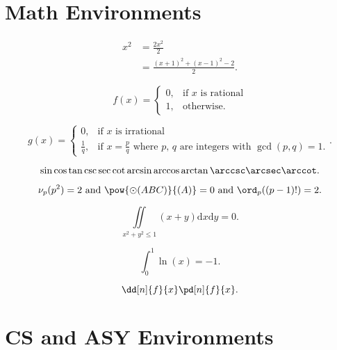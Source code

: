 \documentclass[12pt]{scrartcl}
\begin{document}
\newpage

\section{Math Environments}


\begin{align*}
  x^2
  &= \frac{2x^2}{2}\\
  &= \frac{(x+1)^2+(x-1)^2 - 2}{2}
.\end{align*}

\[
  f(x)=\begin{cases}
    0, & \text{if } x \text{ is rational} \\
    1, & \text{otherwise}
  .\end{cases}
\]

\[
  g(x)=\begin{cases}
    0, & \text{if } x \text{ is irrational}\\
    \frac{1}{q}, & \text{if } x=\frac{p}{q}
    \text{ where $p$, $q$ are integers with $\gcd(p,q)=1$}.
  \end{cases}
.\]

\[
\sin \cos \tan \csc \sec \cot \arcsin \arccos \arctan \arccsc \arcsec \arccot
.\]

\[
\nu_p(p^2) = 2 \text{ and } \pow{\odot(ABC)}{(A)} = 0
\text{ and } \ord_p((p-1)!) = 2
.\]

\[
  \iint\limits_{x^2+y^2\le 1} (x+y)\mathrm{d}x \mathrm{d}y = 0
.\]

\[
  \int_{0}^{1} \ln(x) = -1
.\]

\[
\dd[n]{f}{x} \pd[n]{f}{x}
.\]


\newpage

\section{CS and ASY Environments}
\end{document}
